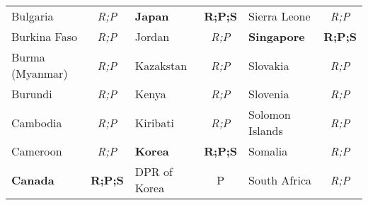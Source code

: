 \documentclass[12pt,twoside,a4paper,notitlepage]{article}
\begin{document}
\begin{table}
\begin{tabular}{|l|c|l|c|l|c|}
  Bulgaria &  {\it R;P} &   \bf Japan &  {\bf R;P;S} & Sierra Leone &  {\it R;P} \\
  
Burkina Faso &  {\it R;P} &     Jordan &  {\it R;P} & \bf Singapore &  {\bf R;P;S} \\

 Burma (Myanmar)   & {\it R;P}  &  Kazakstan &  {\it R;P} &   Slovakia &  {\it R;P} \\

   Burundi &  {\it R;P} &      Kenya &  {\it R;P} &   Slovenia &  {\it R;P} \\
  
  Cambodia &  {\it R;P} &   Kiribati &  {\it R;P} & Solomon Islands &  {\it R;P} \\

  Cameroon &  {\it R;P} &   \bf Korea &  {\bf R;P;S} &    Somalia &  {\it R;P} \\

  \bf Canada &  {\bf R;P;S} & DPR of Korea &          P & South Africa &  {\it R;P} \\
\hline
\end{tabular}    
\end{table}
\end{document}
